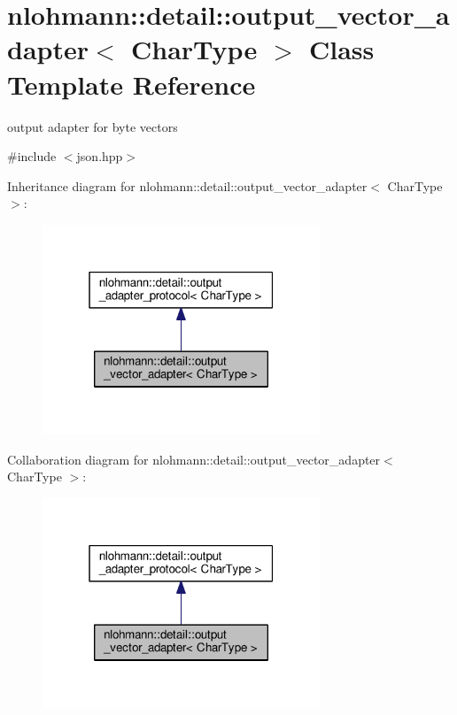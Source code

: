 \hypertarget{classnlohmann_1_1detail_1_1output__vector__adapter}{}\section{nlohmann\+:\+:detail\+:\+:output\+\_\+vector\+\_\+adapter$<$ Char\+Type $>$ Class Template Reference}
\label{classnlohmann_1_1detail_1_1output__vector__adapter}


output adapter for byte vectors  




{\ttfamily \#include $<$json.\+hpp$>$}



Inheritance diagram for nlohmann\+:\+:detail\+:\+:output\+\_\+vector\+\_\+adapter$<$ Char\+Type $>$\+:\nopagebreak
\begin{figure}[H]
\begin{center}
\leavevmode
\includegraphics[width=235pt]{classnlohmann_1_1detail_1_1output__vector__adapter__inherit__graph}
\end{center}
\end{figure}


Collaboration diagram for nlohmann\+:\+:detail\+:\+:output\+\_\+vector\+\_\+adapter$<$ Char\+Type $>$\+:\nopagebreak
\begin{figure}[H]
\begin{center}
\leavevmode
\includegraphics[width=235pt]{classnlohmann_1_1detail_1_1output__vector__adapter__coll__graph}
\end{center}
\end{figure}
